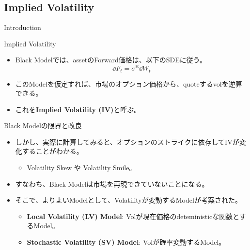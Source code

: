 \documentclass[dvipdfmx,9pt]{beamer}
\begin{document}
\subsection{Implied Volatility}
\begin{frame}{Introduction}
  \begin{block}{Implied Volatility}
    \begin{itemize}
      \item Black Modelでは、assetのForward価格は、以下のSDEに従う。
            \begin{equation}
              \dd F_{t} = \sigma^{\mathrm{B}} \dd W_{t}
            \end{equation}
      \item このModelを仮定すれば、市場のオプション価格から、quoteするvolを逆算できる。
      \item これを\textbf{Implied Volatility (IV)}と呼ぶ。
    \end{itemize}
  \end{block}
  \begin{block}{Black Modelの限界と改良}
    \begin{itemize}
      \item しかし、実際に計算してみると、オプションのストライクに依存してIVが変化することがわかる。
            \begin{itemize}
              \item Volatility Skew や Volatility Smile。
            \end{itemize}
      \item すなわち、Black Modelは市場を再現できていないことになる。
      \item そこで、よりよいModelとして、Volatilityが変動するModelが考案された。
            \begin{itemize}
              \item \textbf{Local Volatility (LV) Model}: Volが現在価格のdeteministicな関数とするModel。
              \item \textbf{Stochastic Volatility (SV) Model}: Volが確率変動するModel。
            \end{itemize}
    \end{itemize}
  \end{block}
\end{frame}
\end{document}
